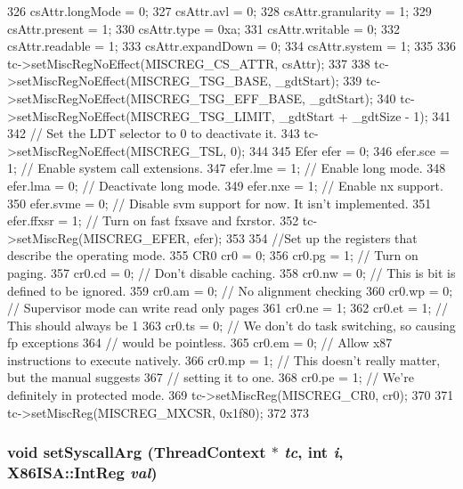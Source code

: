 \begin{DoxyCode}
{{326         csAttr.longMode = 0;
327         csAttr.avl = 0;
328         csAttr.granularity = 1;
329         csAttr.present = 1;
330         csAttr.type = 0xa;
331         csAttr.writable = 0;
332         csAttr.readable = 1;
333         csAttr.expandDown = 0;
334         csAttr.system = 1;
335 
336         tc->setMiscRegNoEffect(MISCREG_CS_ATTR, csAttr);
337 
338         tc->setMiscRegNoEffect(MISCREG_TSG_BASE, _gdtStart);
339         tc->setMiscRegNoEffect(MISCREG_TSG_EFF_BASE, _gdtStart);
340         tc->setMiscRegNoEffect(MISCREG_TSG_LIMIT, _gdtStart + _gdtSize - 1);
341 
342         // Set the LDT selector to 0 to deactivate it.
343         tc->setMiscRegNoEffect(MISCREG_TSL, 0);
344 
345         Efer efer = 0;
346         efer.sce = 1; // Enable system call extensions.
347         efer.lme = 1; // Enable long mode.
348         efer.lma = 0; // Deactivate long mode.
349         efer.nxe = 1; // Enable nx support.
350         efer.svme = 0; // Disable svm support for now. It isn't implemented.
351         efer.ffxsr = 1; // Turn on fast fxsave and fxrstor.
352         tc->setMiscReg(MISCREG_EFER, efer);
353 
354         //Set up the registers that describe the operating mode.
355         CR0 cr0 = 0;
356         cr0.pg = 1; // Turn on paging.
357         cr0.cd = 0; // Don't disable caching.
358         cr0.nw = 0; // This is bit is defined to be ignored.
359         cr0.am = 0; // No alignment checking
360         cr0.wp = 0; // Supervisor mode can write read only pages
361         cr0.ne = 1;
362         cr0.et = 1; // This should always be 1
363         cr0.ts = 0; // We don't do task switching, so causing fp exceptions
364                     // would be pointless.
365         cr0.em = 0; // Allow x87 instructions to execute natively.
366         cr0.mp = 1; // This doesn't really matter, but the manual suggests
367                     // setting it to one.
368         cr0.pe = 1; // We're definitely in protected mode.
369         tc->setMiscReg(MISCREG_CR0, cr0);
370 
371         tc->setMiscReg(MISCREG_MXCSR, 0x1f80);
372     }
373 }
\end{DoxyCode}
\hypertarget{classX86ISA_1_1I386LiveProcess_a834e8e05416e3487f87d942259506abe}{
\subsubsection[{setSyscallArg}]{\setlength{\rightskip}{0pt plus 5cm}void setSyscallArg ({\bf ThreadContext} $\ast$ {\em tc}, \/  int {\em i}, \/  {\bf X86ISA::IntReg} {\em val})}}
\label{classX86ISA_1_1I386LiveProcess_a834e8e05416e3487f87d942259506abe}



